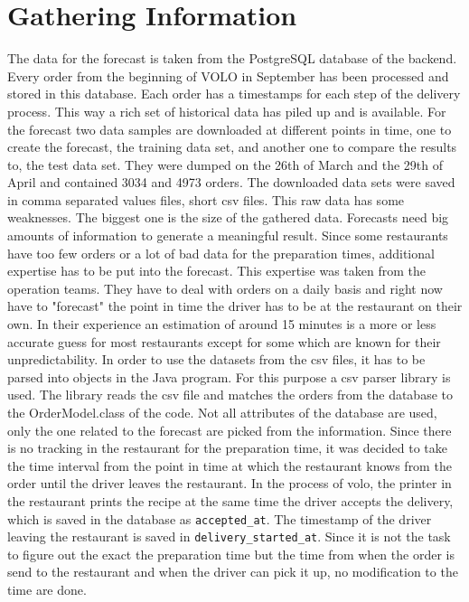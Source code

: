 \section{Gathering Information}\label{section:Gathering Information}
The data for the forecast is taken from the PostgreSQL database of the backend. Every order from the beginning of VOLO in September has been processed and stored in this database. Each order has a timestamps for each step of the delivery process. This way a rich set of historical data has piled up and is available. For the forecast two data samples are downloaded at different points in time, one to create the forecast, the training data set, and another one to compare the results to, the test data set. They were dumped on the 26th of March and the 29th of April and contained 3034 and 4973 orders. The downloaded data sets were saved in comma separated values files, short csv files.\newline
This raw data has some weaknesses. The biggest one is the size of the gathered data. Forecasts need big amounts of information to generate a meaningful result. Since some restaurants have too few orders or a lot of bad data for the preparation times, additional expertise has to be put into the forecast. This expertise was taken from the operation teams. They have to deal with orders on a daily basis and right now have to "forecast" the point in time the driver has to be at the restaurant on their own. In their experience an estimation of around 15 minutes is a more or less accurate guess for most restaurants except for some which are known for their unpredictability.\newline
In order to use the datasets from the csv files, it has to be parsed into objects in the Java program. For this purpose a csv parser library is used. The library reads the csv file and matches the orders from the database to the OrderModel.class of the code. Not all attributes of the database are used, only the one related to the forecast are picked from the information. Since there is no tracking in the restaurant for the preparation time, it was decided to take the time interval from the point in time at which the restaurant knows from the order until the driver leaves the restaurant. In the process of volo, the printer in the restaurant prints the recipe at the same time the driver accepts the delivery, which is saved in the database as \texttt{accepted\_at}. The timestamp of the driver leaving the restaurant is saved in \texttt{delivery\_started\_at}. Since it is not the task to figure out the exact the preparation time but the time from when the order is send to the restaurant and when the driver can pick it up, no modification to the time are done.
